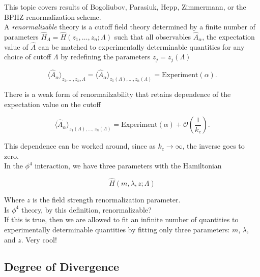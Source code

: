 \noindent This topic covers results of Bogoliubov, Parasiuk, Hepp, Zimmermann, or the BPHZ renormalization scheme. \\

\noindent A \textit{renormalizable} theory is a cutoff field theory determined by a finite number of parameters $\hat{H}_\Lambda = \hat{H} (z_1, \dots, z_n; \Lambda)$ such that all observables $\hat{A}_\alpha$, the expectation value of $\hat{A}$ can be matched to experimentally determinable quantities for any choice of cutoff $\Lambda$ by redefining the parameters $z_j = z_j (\Lambda)$

\begin{equation}
\langle \hat{A}_\alpha \rangle _{z_1, \dots, z_n, \Lambda} = \langle \hat{A}_\alpha \rangle _{z_1 (\Lambda), \dots, z_n (\Lambda)} = \text{Experiment} (\alpha) .
\end{equation}

\noindent There is a weak form of renormailzability that retains dependence of the expectation value on the cutoff

\begin{equation}
\langle \hat{A}_\alpha \rangle _{z_1 (\Lambda), \dots, z_n (\Lambda)} = \text{Experiment} (\alpha) + \mathcal{O} \left(\frac{1}{k_c}\right).
\end{equation}

\noindent This dependence can be worked around, since as $k_c \rightarrow \infty$, the inverse goes to zero. \\

\noindent In the $\phi^4$ interaction, we have three parameters with the Hamiltonian

\begin{equation}
\hat{H} (m, \lambda, z ; \Lambda)
\end{equation}

\noindent Where $z$ is the field strength renormalization parameter. \\

\noindent Is $\phi^4$ theory, by this definition, renormalizable? \\

\noindent If this is true, then we are allowed to fit an infinite number of quantities to experimentally determinable quantities by fitting only three parameters: $m$, $\lambda$, and $z$. Very cool! \\

\subsection*{Degree of Divergence}

